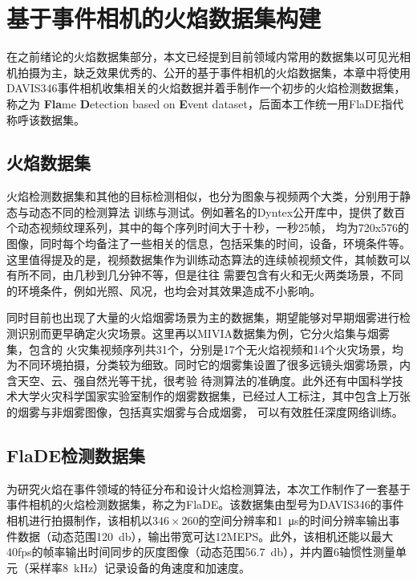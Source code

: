 
\chapter{基于事件相机的火焰数据集构建}
在之前绪论的火焰数据集部分，本文已经提到目前领域内常用的数据集以可见光相机拍摄为主，缺乏效果优秀的、公开的基于事件相机的火焰数据集，本章中将使用DAVIS346事件相机收集相关的火焰数据并着手制作一个初步的火焰检测数据集，称之为 \textbf{Fla}me \textbf{D}etection based on \textbf{E}vent dataset，后面本工作统一用FlaDE指代称呼该数据集。

\section{火焰数据集}
火焰检测数据集和其他的目标检测相似，也分为图象与视频两个大类，分别用于静态与动态不同的检测算法
训练与测试。例如著名的Dyntex公开库\cite{peteri2008comprehensive}中，提供了数百个动态视频纹理系列，其中的每个序列时间大于十秒，一秒25帧，
均为720x576的图像，同时每个均备注了一些相关的信息，包括采集的时间，设备，环境条件等。这里值得提及的是，视频数据集作为训练动态算法的连续帧视频文件，其帧数可以有所不同，由几秒到几分钟不等，但是往往
需要包含有火和无火两类场景，不同的环境条件，例如光照、风况，也均会对其效果造成不小影响。

同时目前也出现了大量的火焰烟雾场景为主的数据集，期望能够对早期烟雾进行检测识别而更早确定火灾场景。这里再以MIVIA数据集\cite{foggia2015real}为例，它分火焰集与烟雾集，包含的
火灾集视频序列共31个，分别是17个无火焰视频和14个火灾场景，均为不同环境拍摄，分类较为细致。同时它的烟雾集设置了很多远镜头烟雾场景，内含天空、云、强自然光等干扰，很考验
待测算法的准确度。此外还有中国科学技术大学火灾科学国家实验室制作的烟雾数据集，已经过人工标注，其中包含上万张的烟雾与非烟雾图像，包括真实烟雾与合成烟雾，
可以有效胜任深度网络训练。

\section{FlaDE检测数据集}
为研究火焰在事件领域的特征分布和设计火焰检测算法，本次工作制作了一套基于事件相机的火焰检测数据集，称之为FlaDE。该数据集由型号为DAVIS346的事件相机进行拍摄制作，该相机以$346\times260$的空间分辨率和\SI{1}{\micro\second}的时间分辨率输出事件数据（动态范围\SI{120}{\decibel}），输出带宽可达12MEPS。此外，该相机还能以最大40fps的帧率输出时间同步的灰度图像（动态范围\SI{56.7}{\decibel}），并内置6轴惯性测量单元（采样率\SI{8}{\kilo\hertz}）记录设备的角速度和加速度。

